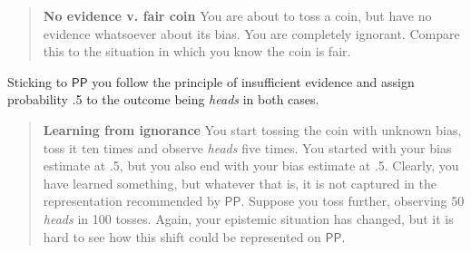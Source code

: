 \documentclass[
  10pt,
  dvipsnames,enabledeprecatedfontcommands]{scrartcl}
\newcommand{\s}[1]{\mbox{$\mathsf{#1}$}}
\begin{document}
\begin{quote}
\textbf{No evidence v. fair coin}
You are about to toss a coin, but have no evidence 
whatsoever about its bias. You are completely ignorant.   Compare this to the situation  in which you know the coin is fair. 
\end{quote}

\noindent Sticking to \s{PP} you follow the principle of insufficient
evidence and assign probability .5 to the outcome being \emph{heads} in
both cases.

\begin{quote}
\textbf{Learning from ignorance}
You start  tossing the  coin with unknown bias, toss it ten times and observe \emph{heads} five times. You started with your bias estimate at .5, but you also end with your bias estimate at .5. Clearly, you have learned something, but whatever that is, it is not captured in the representation recommended by \s{PP}. Suppose you toss further, observing 50 \emph{heads} in 100 tosses. Again, your epistemic situation has changed, but it is hard to see how this shift could be represented on \s{PP}.
\end{quote}
\end{document}
